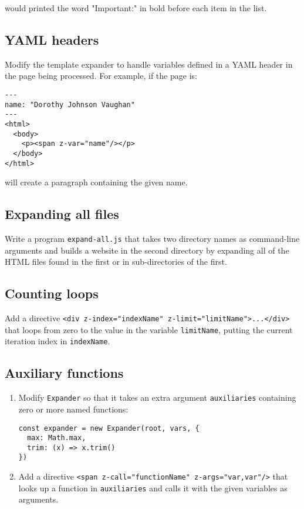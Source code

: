 \documentclass[krantzl]{krantz}
\begin{document}
\noindent would printed the word "Important:" in bold before each item in the list.

\subsection*{YAML headers}


Modify the template expander to handle variables defined in a YAML header in the page being processed.
For example, if the page is:

\begin{lstlisting}[frame=single,frameround=tttt]
---
name: "Dorothy Johnson Vaughan"
---
<html>
  <body>
    <p><span z-var="name"/></p>
  </body>
</html>
\end{lstlisting}


\noindent will create a paragraph containing the given name.

\subsection*{Expanding all files}


Write a program \texttt{expand-all.js} that takes two directory names as command-line arguments
and builds a website in the second directory by expanding all of the HTML files found in the first
or in sub-directories of the first.

\subsection*{Counting loops}


Add a directive \texttt{<div z-index="indexName" z-limit="limitName">...</div>}
that loops from zero to the value in the variable \texttt{limitName},
putting the current iteration index in \texttt{indexName}.

\subsection*{Auxiliary functions}

\begin{enumerate}

\item 

Modify \texttt{Expander} so that it takes an extra argument \texttt{auxiliaries}
    containing zero or more named functions:

\begin{lstlisting}[frame=single,frameround=tttt]
const expander = new Expander(root, vars, {
  max: Math.max,
  trim: (x) => x.trim()
})
\end{lstlisting}



\item 

Add a directive \texttt{<span z-call="functionName" z-args="var,var"/>}
    that looks up a function in \texttt{auxiliaries} and calls it
    with the given variables as arguments.



\end{enumerate}
\end{document}

